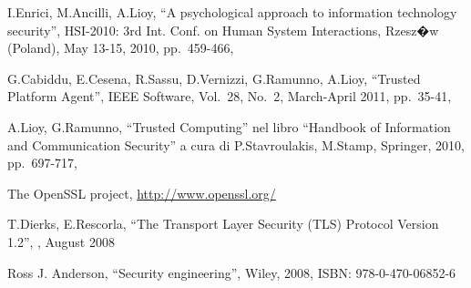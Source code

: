 

\iffalse
\begin{thebibliography}{9} %

I.Enrici, M.Ancilli, A.Lioy, %
``A psychological approach to information technology security'', %
HSI-2010: 3rd Int. Conf. on Human System Interactions, %
Rzesz�w (Poland), May 13-15, 2010, %
pp.\ 459-466, %

G.Cabiddu, E.Cesena, R.Sassu, D.Vernizzi, G.Ramunno, A.Lioy,  %
``Trusted Platform Agent'', %
IEEE Software, %
Vol.\ 28, No.\ 2, %
March-April 2011, %
pp.\ 35-41, %


A.Lioy, G.Ramunno, %
``Trusted Computing'' %
nel libro %
``Handbook of Information and Communication Security'' %
a cura di %
P.Stavroulakis, M.Stamp, %
Springer, %
2010, %
pp.\ 697-717, %

The OpenSSL project, %
\url{http://www.openssl.org/} %

T.Dierks, E.Rescorla,
``The Transport Layer Security (TLS) Protocol Version 1.2'',
, August 2008

Ross J. Anderson,
``Security engineering'',
Wiley, 2008,
ISBN: 978-0-470-06852-6


\end{thebibliography}
